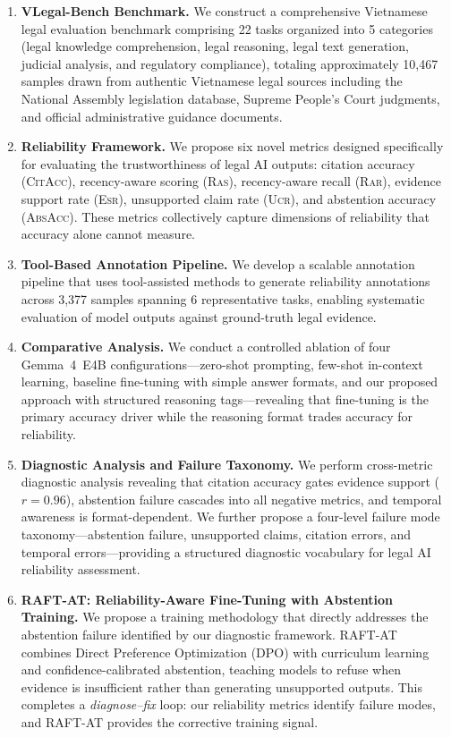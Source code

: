 \documentclass[11pt,a4paper]{article}
\newcommand{\system}{VLegal-Bench}
\newcommand{\model}{Gemma~4~E4B}
\newcommand{\citacc}{\textsc{CitAcc}}
\newcommand{\ras}{\textsc{Ras}}
\newcommand{\rar}{\textsc{Rar}}
\newcommand{\esr}{\textsc{Esr}}
\newcommand{\ucr}{\textsc{Ucr}}
\newcommand{\absacc}{\textsc{AbsAcc}}
\begin{document}
\begin{enumerate}[leftmargin=*, itemsep=2pt]
    \item \textbf{\system{} Benchmark.} We construct a comprehensive Vietnamese legal evaluation benchmark comprising 22 tasks organized into 5 categories (legal knowledge comprehension, legal reasoning, legal text generation, judicial analysis, and regulatory compliance), totaling approximately 10{,}467 samples drawn from authentic Vietnamese legal sources including the National Assembly legislation database, Supreme People's Court judgments, and official administrative guidance documents.

    \item \textbf{Reliability Framework.} We propose six novel metrics designed specifically for evaluating the trustworthiness of legal AI outputs: citation accuracy (\citacc), recency-aware scoring (\ras), recency-aware recall (\rar), evidence support rate (\esr), unsupported claim rate (\ucr), and abstention accuracy (\absacc). These metrics collectively capture dimensions of reliability that accuracy alone cannot measure.

    \item \textbf{Tool-Based Annotation Pipeline.} We develop a scalable annotation pipeline that uses tool-assisted methods to generate reliability annotations across 3{,}377 samples spanning 6 representative tasks, enabling systematic evaluation of model outputs against ground-truth legal evidence.

    \item \textbf{Comparative Analysis.} We conduct a controlled ablation of four \model{} configurations---zero-shot prompting, few-shot in-context learning, baseline fine-tuning with simple answer formats, and our proposed approach with structured reasoning tags---revealing that fine-tuning is the primary accuracy driver while the reasoning format trades accuracy for reliability.

    \item \textbf{Diagnostic Analysis and Failure Taxonomy.} We perform cross-metric diagnostic analysis revealing that citation accuracy gates evidence support ($r = 0.96$), abstention failure cascades into all negative metrics, and temporal awareness is format-dependent. We further propose a four-level failure mode taxonomy---abstention failure, unsupported claims, citation errors, and temporal errors---providing a structured diagnostic vocabulary for legal AI reliability assessment.

    \item \textbf{RAFT-AT: Reliability-Aware Fine-Tuning with Abstention Training.} We propose a training methodology that directly addresses the abstention failure identified by our diagnostic framework. RAFT-AT combines Direct Preference Optimization (DPO) with curriculum learning and confidence-calibrated abstention, teaching models to refuse when evidence is insufficient rather than generating unsupported outputs. This completes a \emph{diagnose--fix} loop: our reliability metrics identify failure modes, and RAFT-AT provides the corrective training signal.
\end{enumerate}
\end{document}
